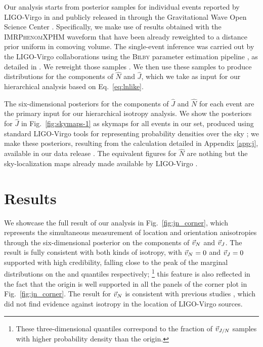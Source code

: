 \documentclass[twocolumn,twocolappendix,linenumbers]{aastex631}
\newcommand{\clJ}{}
\newcommand{\clN}{}
\begin{document}
Our analysis starts from posterior samples for individual events reported by LIGO-Virgo in \citet{LIGOScientific:2021djp,LIGOScientific:2021usb} and publicly released in \citet{zenodo:GWTC-2.1,zenodo:GWTC-3} through the Gravitational Wave Open Science Center \citep{GWOSC:GWTC-2.1,GWOSC:GWTC-3,LIGOScientific:2019lzm}.
Specifically, we make use of results obtained with the \textsc{IMRPhenomXPHM} waveform \citep{Pratten:2020ceb,Pratten:2020fqn,Garcia-Quiros:2020qpx,Garcia-Quiros:2020qlt} that have been already reweighted to a distance prior uniform in comoving volume.
The single-event inference was carried out by the LIGO-Virgo collaborations using the \textsc{Bilby} parameter estimation pipeline \citep{Romero-Shaw:2020owr,Ashton:2018jfp}, as detailed in \citet{LIGOScientific:2021djp,LIGOScientific:2021usb}.
We reweight those samples .
We then use these samples to produce distributions for the components of $\hat{N}$ and $\hat{J}$, which we take as input for our hierarchical analysis based on Eq.~\eqref{eq:lnlike}.

The six-dimensional posteriors for the components of $\hat{J}$ and $\hat{N}$ for each event are the primary input for our hierarchical isotropy analysis.
We show the posteriors for $\hat{J}$ in Fig.~\ref{fig:skymaps-1} as skymaps for all events in our set, produced using standard LIGO-Virgo tools for representing probability densities over the sky \citep{skymap,Singer:2016eax,Singer:2016erz}; we make these posteriors, resulting from the calculation detailed in Appendix \ref{app:j}, available in our data release \citep{repo}.
The equivalent figures for $\hat{N}$ are nothing but the sky-localization maps already made available by LIGO-Virgo \citep{zenodo:GWTC-2.1,zenodo:GWTC-3}.

\section{Results}
\label{sec:results}

We showcase the full result of our analysis in Fig.~\ref{fig:jn_corner}, which represents the simultaneous measurement of location and orientation anisotropies through the six-dimensional posterior on the components of $\vec{v}_{N}$ and $\vec{v}_{J}$.
The result is fully consistent with both kinds of isotropy, with $\vec{v}_{N} = 0$ and $\vec{v}_{J} = 0$ supported with high credibility, falling close to the peak of the marginal distributions on the \clN and \clJ quantiles respectively;%
\footnote{These three-dimensional quantiles correspond to the fraction of $\vec{v}_{J/N}$ samples with higher probability density than the origin.}
 this feature is also reflected in the fact that the origin is well supported in all the panels of the corner plot in Fig.~\ref{fig:jn_corner}.
The result for $\vec{v}_{N}$ is consistent with previous studies \citep{Essick:2022slj}, which did not find evidence against isotropy in the location of LIGO-Virgo sources.
\end{document}
